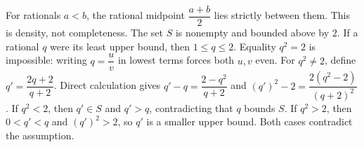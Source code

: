 For rationals $ a<b $, the rational midpoint $\dfrac{a+b}{2}$ lies strictly between them. This is density, not completeness. The set $ S $ is nonempty and bounded above by $ 2 $. If a rational $ q $ were its least upper bound, then $ 1\le q\le2 $. Equality $ q^2=2 $ is impossible: writing $ q=\dfrac{u}{v} $ in lowest terms forces both $ u,v $ even. For $ q^2\ne2 $, define $ q\prime=\dfrac{2q+2}{q+2}$. Direct calculation gives $ q\prime-q=\dfrac{2-q^2}{q+2}$ and $(q\prime)^2-2=\dfrac{2(q^2-2)}{(q+2)^2}$. If $ q^2<2 $, then $ q\prime\in S $ and $ q\prime>q $, contradicting that $ q $ bounds $ S $. If $ q^2>2 $, then $ 0<q\prime<q $ and $(q\prime)^2>2 $, so $ q\prime $ is a smaller upper bound. Both cases contradict the assumption.
